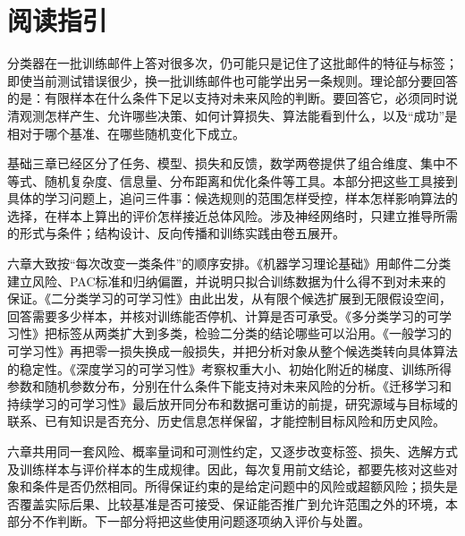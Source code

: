 \chapter*{阅读指引}

分类器在一批训练邮件上答对很多次，仍可能只是记住了这批邮件的特征与标签；即使当前测试错误很少，换一批训练邮件也可能学出另一条规则。理论部分要回答的是：有限样本在什么条件下足以支持对未来风险的判断。要回答它，必须同时说清观测怎样产生、允许哪些决策、如何计算损失、算法能看到什么，以及“成功”是相对于哪个基准、在哪些随机变化下成立。

基础三章已经区分了任务、模型、损失和反馈，数学两卷提供了组合维度、集中不等式、随机复杂度、信息量、分布距离和优化条件等工具。本部分把这些工具接到具体的学习问题上，追问三件事：候选规则的范围怎样受控，样本怎样影响算法的选择，在样本上算出的评价怎样接近总体风险。涉及神经网络时，只建立推导所需的形式与条件；结构设计、反向传播和训练实践由卷五展开。

六章大致按“每次改变一类条件”的顺序安排。《机器学习理论基础》用邮件二分类建立风险、PAC标准和归纳偏置，并说明只拟合训练数据为什么得不到对未来的保证。《二分类学习的可学习性》由此出发，从有限个候选扩展到无限假设空间，回答需要多少样本，并核对训练能否停机、计算是否可承受。《多分类学习的可学习性》把标签从两类扩大到多类，检验二分类的结论哪些可以沿用。《一般学习的可学习性》再把零一损失换成一般损失，并把分析对象从整个候选类转向具体算法的稳定性。《深度学习的可学习性》考察权重大小、初始化附近的梯度、训练所得参数和随机参数分布，分别在什么条件下能支持对未来风险的分析。《迁移学习和持续学习的可学习性》最后放开同分布和数据可重访的前提，研究源域与目标域的联系、已有知识是否充分、历史信息怎样保留，才能控制目标风险和历史风险。

六章共用同一套风险、概率量词和可测性约定，又逐步改变标签、损失、选解方式及训练样本与评价样本的生成规律。因此，每次复用前文结论，都要先核对这些对象和条件是否仍然相同。所得保证约束的是给定问题中的风险或超额风险；损失是否覆盖实际后果、比较基准是否可接受、保证能否推广到允许范围之外的环境，本部分不作判断。下一部分将把这些使用问题逐项纳入评价与处置。
